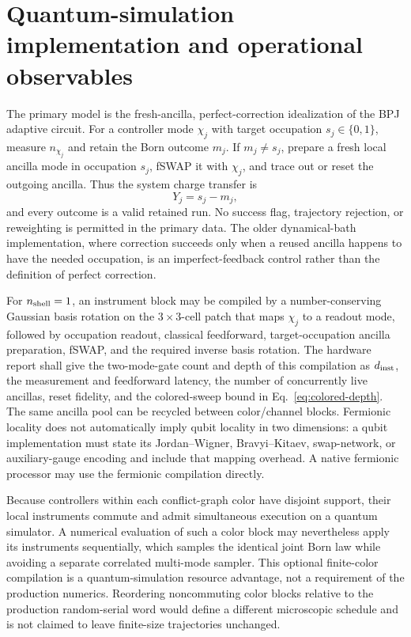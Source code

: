 \documentclass[aps,prx,onecolumn,nofootinbib,superscriptaddress,longbibliography]{revtex4-2}
\begin{document}
\section{Quantum-simulation implementation and operational observables}

The primary model is the fresh-ancilla, perfect-correction idealization of the BPJ adaptive
circuit.  For a controller mode $\chi_j$ with target occupation $s_j\in\{0,1\}$, measure
$n_{\chi_j}$ and retain the Born outcome $m_j$.  If $m_j\ne s_j$, prepare a fresh local
ancilla mode in occupation $s_j$, fSWAP it with $\chi_j$, and trace out or reset the outgoing
ancilla.  Thus the system charge transfer is
\begin{equation}
 Y_j=s_j-m_j,
\end{equation}
and every outcome is a valid retained run.  No success flag, trajectory rejection, or
reweighting is permitted in the primary data.  The older dynamical-bath implementation,
where correction succeeds only when a reused ancilla happens to have the needed
occupation, is an imperfect-feedback control rather than the definition of perfect
correction.

For $n_{\rm shell}=1$, an instrument block may be compiled by a number-conserving Gaussian
basis rotation on the $3\times3$-cell patch that maps $\chi_j$ to a readout mode, followed
by occupation readout, classical feedforward, target-occupation ancilla preparation,
fSWAP, and the required inverse basis rotation.  The hardware report shall give the
two-mode-gate count and depth of this compilation as $d_{\rm inst}$, the measurement and
feedforward latency, the number of concurrently live ancillas, reset fidelity, and the
colored-sweep bound in Eq.~\eqref{eq:colored-depth}.  The same ancilla pool can be recycled
between color/channel blocks.  Fermionic locality does not automatically imply qubit
locality in two dimensions: a qubit implementation must state its Jordan--Wigner,
Bravyi--Kitaev, swap-network, or auxiliary-gauge encoding and include that mapping
overhead.  A native fermionic processor may use the fermionic compilation directly.

Because controllers within each conflict-graph color have disjoint support, their local
instruments commute and admit simultaneous execution on a quantum simulator.  A numerical
evaluation of such a color block may nevertheless apply its instruments sequentially,
which samples the identical joint Born law while avoiding a separate correlated multi-mode
sampler.  This optional finite-color compilation is a quantum-simulation resource
advantage, not a requirement of the production numerics.  Reordering noncommuting color
blocks relative to the production random-serial word would define a different microscopic
schedule and is not claimed to leave finite-size trajectories unchanged.
\end{document}
